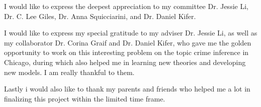 

I would like to express the deepest appreciation to my committee Dr. Jessie Li, Dr. C. Lee Giles, Dr. Anna Squicciarini, and Dr. Daniel Kifer. 

I would like to express my special gratitude to my adviser Dr. Jessie Li, as well as my collaborator Dr. Corina Graif and Dr. Daniel Kifer, who gave me the golden opportunity to work on this interesting problem on the topic crime inference in Chicago, during which also helped me in learning new theories and developing new models. I am really thankful to them.

Lastly i would also like to thank my parents and friends who helped me a lot in finalizing this project within the limited time frame.